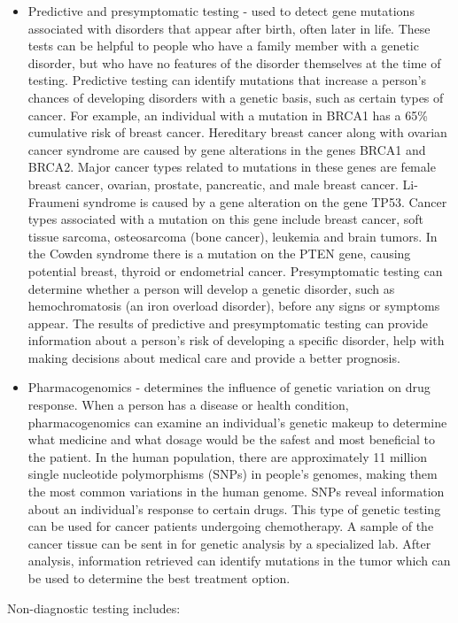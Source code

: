 \begin{itemize}
\item
  Predictive and presymptomatic testing - used to detect gene mutations associated with disorders that appear after birth, often later in life. These tests can be helpful to people who have a family member with a genetic disorder, but who have no features of the disorder themselves at the time of testing. Predictive testing can identify mutations that increase a person's chances of developing disorders with a genetic basis, such as certain types of cancer. For example, an individual with a mutation in BRCA1 has a 65\% cumulative risk of breast cancer. Hereditary breast cancer along with ovarian cancer syndrome are caused by gene alterations in the genes BRCA1 and BRCA2. Major cancer types related to mutations in these genes are female breast cancer, ovarian, prostate, pancreatic, and male breast cancer. Li-Fraumeni syndrome is caused by a gene alteration on the gene TP53. Cancer types associated with a mutation on this gene include breast cancer, soft tissue sarcoma, osteosarcoma (bone cancer), leukemia and brain tumors. In the Cowden syndrome there is a mutation on the PTEN gene, causing potential breast, thyroid or endometrial cancer. Presymptomatic testing can determine whether a person will develop a genetic disorder, such as hemochromatosis (an iron overload disorder), before any signs or symptoms appear. The results of predictive and presymptomatic testing can provide information about a person's risk of developing a specific disorder, help with making decisions about medical care and provide a better prognosis.
\item
  Pharmacogenomics - determines the influence of genetic variation on drug response. When a person has a disease or health condition, pharmacogenomics can examine an individual's genetic makeup to determine what medicine and what dosage would be the safest and most beneficial to the patient. In the human population, there are approximately 11 million single nucleotide polymorphisms (SNPs) in people's genomes, making them the most common variations in the human genome. SNPs reveal information about an individual's response to certain drugs. This type of genetic testing can be used for cancer patients undergoing chemotherapy. A sample of the cancer tissue can be sent in for genetic analysis by a specialized lab. After analysis, information retrieved can identify mutations in the tumor which can be used to determine the best treatment option.
\end{itemize}

Non-diagnostic testing includes:

